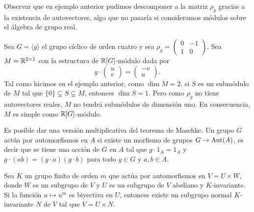 Observar que en ejemplo anterior pudimos descomponer a la matriz $\rho_g$ 
gracias a la existencia de autovectores, algo 
que no pasaría si consideramos módulos sobre el álgebra de grupo real.   

\begin{example}
Sea $G=\langle g\rangle$ el grupo cíclico de orden cuatro y sea $\rho_g=\begin{pmatrix}
0&-1\\
1&0\end{pmatrix}$. 
Sea $M=\mathbb{R}^{2\times 1}$ con la estructura de $\mathbb{R}[G]$-módulo dada por 
\[
g\cdot\begin{pmatrix}u\\v\end{pmatrix}
=\begin{pmatrix}-v\\u\end{pmatrix}.
\]
Tal como hicimos en el ejemplo anterior, 
como $\dim M=2$, si $S$ es un submódulo de $M$ tal que $\{0\}\subsetneq S\subsetneq M$, entonces $\dim S=1$. 
Pero como $\rho_g$ no tiene autovectores reales, $M$ no tendrá submódulos de dimensión uno.  
En consecuencia, $M$ es simple como $\mathbb{R}[G]$-módulo. 
\end{example}

Es posible dar una versión multiplicativa del teorema de Maschke. 
Un grupo $G$ actúa por automorfismos en $A$ si existe
un morfismo de grupos $G\to\operatorname{Aut}(A)$, es decir que se tiene una acción de $G$ en $A$ 
tal que $g\cdot 1_A=1_A$ y $g\cdot (ab)=(g\cdot a)(g\cdot b)$ para todo $g\in G$ y $a,b\in A$. 

\begin{theorem}
Sea $K$ un grupo finito de orden $m$ que actúa por automorfismos en $V=U\times W$, donde $W$ es un subgrupo de $V$ y 
$U$ es un subgrupo de $V$ abeliano y $K$-invariante. Si la función $u\mapsto u^m$ es biyectiva en $U$, 
entonces existe un subgrupo normal $K$-invariante $N$ de $V$ tal que $V=U\times N$.
\end{theorem}

